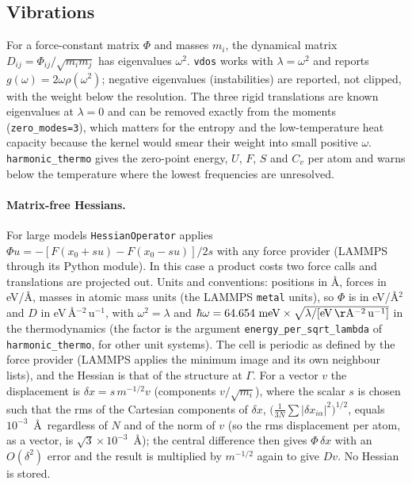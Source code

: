 \documentclass[reprint,nofootinbib,superscriptaddress,amsmath,amssymb,aps,prb,floatfix]{revtex4-2}
\begin{document}
\subsection{Vibrations}
\label{sec:vib}

For a force-constant matrix $\Phi$ and masses $m_i$, the dynamical matrix $D_{ij}=\Phi_{ij}/\sqrt{m_im_j}$ has eigenvalues $\omega^2$.
\texttt{vdos} works with $\lambda=\omega^2$ and reports $g(\omega)=2\omega\rho(\omega^2)$; negative eigenvalues (instabilities) are reported, not clipped, with the weight below the resolution.
The three rigid translations are known eigenvalues at $\lambda=0$ and can be removed exactly from the moments (\texttt{zero\_modes=3}), which matters for the entropy and the low-temperature heat capacity because the kernel would smear their weight into small positive $\omega$.
\texttt{harmonic\_thermo} gives the zero-point energy, $U$, $F$, $S$ and $C_v$ per atom and warns below the temperature where the lowest frequencies are unresolved.
\paragraph*{Matrix-free Hessians.}
For large models \texttt{HessianOperator} applies $\Phi u=-[F(x_0+su)-F(x_0-su)]/2s$ with any force provider (LAMMPS through its Python module). In this case a product costs two force calls and translations are projected out.
Units and conventions: positions in \AA, forces in eV/\AA, masses in atomic mass units (the LAMMPS \texttt{metal} units), so $\Phi$ is in eV/\AA$^2$ and $D$ in eV\,\AA$^{-2}$\,u$^{-1}$, with $\omega^2=\lambda$ and $\hbar\omega=64.654~\mathrm{meV}\times\sqrt{\lambda/[\mathrm{eV\,\AA^{-2}\,u^{-1}}]}$ in the thermodynamics (the factor is the argument \texttt{energy\_per\_sqrt\_lambda} of \texttt{harmonic\_thermo}, for other unit systems). The cell is periodic as defined by the force provider (LAMMPS applies the minimum image and its own neighbour lists), and the Hessian is that of the structure at $\Gamma$. For a vector $v$ the displacement is $\delta x=s\,m^{-1/2}v$ (components $v/\sqrt{m_i}$), where the scalar $s$ is chosen such that the rms of the Cartesian components of $\delta x$, $\bigl(\tfrac1{3N}\sum|\delta x_{i\alpha}|^2\bigr)^{1/2}$, equals $10^{-3}$~\AA\ regardless of $N$ and of the norm of $v$ (so the rms displacement per atom, as a vector, is $\sqrt3\times10^{-3}$~\AA); the central difference then gives $\Phi\,\delta x$ with an $O(\delta^2)$ error and the result is multiplied by $m^{-1/2}$ again to give $Dv$.
No Hessian is stored.
\end{document}
